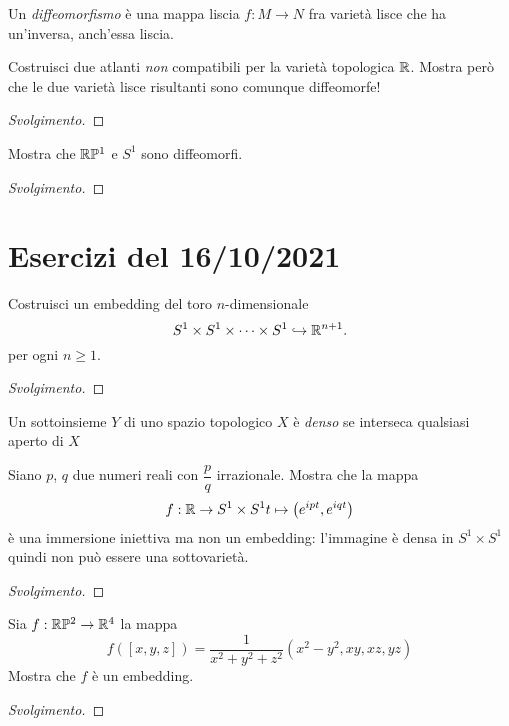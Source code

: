 \documentclass[a4paper, 12pt, italian]{article}
\begin{document}
Un \emph{diffeomorfismo} è una mappa liscia $f: M \to N$ fra varietà lisce
che ha un'inversa, anch'essa liscia.

\begin{exercise}
Costruisci due atlanti \emph{non} compatibili per la varietà topologica $\mathbb{R}$.
Mostra però che le due varietà lisce risultanti sono comunque diffeomorfe!
\begin{proof}[Svolgimento]

\end{proof}
\end{exercise}

\begin{exercise}
Mostra che $\mathbb{R}\mathbb{P}^1$ e $S^1$ sono diffeomorfi.
\begin{proof}[Svolgimento]

\end{proof}
\end{exercise}

\section{Esercizi del 16/10/2021}
\begin{exercise}
Costruisci un embedding del toro $n$-dimensionale
\[
S^1 \times S^1 \times \cdots \times S^1 \hookrightarrow \mathbb{R}^{n + 1}
.\] 
per ogni $n \geq 1$.
\begin{proof}[Svolgimento]

\end{proof}
\end{exercise}

Un sottoinsieme $Y$ di uno spazio topologico $X$ è \emph{denso} se interseca
qualsiasi aperto di $X$

\begin{exercise}
Siano $p$, $q$ due numeri reali con $\dfrac{p}{q}$ irrazionale. Mostra che la
mappa
\[
f : \mathbb{R} \to S^1 \times S^1 \\
t \mapsto \left( e^{ipt}, e^{iqt} \right)
\] 
è una immersione iniettiva ma non un embedding: l’immagine è densa in
$S^1 \times S^1$ quindi non può essere una sottovarietà.
\begin{proof}[Svolgimento]
    
\end{proof}
\end{exercise}

\begin{exercise}
Sia $f: \mathbb{R}\mathbb{P}^2 \to \mathbb{R}^4$ la mappa
\[
f([x, y, z]) = \frac{1}{x^2 + y^2 + z^2} (x^2 - y^2, xy, xz, yz)
\] 
Mostra che $f$ è un embedding.
\begin{proof}[Svolgimento]
    
\end{proof}
\end{exercise}
\end{document}
